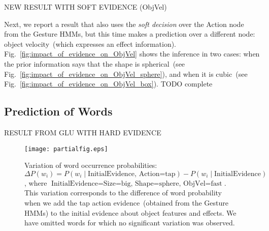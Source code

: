 NEW RESULT WITH SOFT EVIDENCE (ObjVel)

\begin{figure*}
\centering
{} \quad
%
\caption{Predictions about the object velocity of different objects, when given probabilistic soft evidence about the action.}
\label{fig:impact_of_evidence_on_ObjVel}
\end{figure*}

Next, we report a result that also uses the \emph{soft decision} over the Action node from the Gesture \acp{HMM}, but this time makes a prediction over a different node: object velocity~(which expresses an effect information).
Fig.~\ref{fig:impact_of_evidence_on_ObjVel} shows the inference in two cases: when the prior information says that the shape is spherical~(see Fig.~\ref{fig:impact_of_evidence_on_ObjVel_sphere}), and when it is cubic~(see Fig.~\ref{fig:impact_of_evidence_on_ObjVel_box}).
TODO complete

\subsection{Prediction of Words}

RESULT FROM GLU WITH HARD EVIDENCE

\begin{figure}
\centering
\texttt{[image: partialfig.eps]}
\caption{Variation of word occurrence probabilities:
$\Delta P(w_i) = P(w_i \mid \text{InitialEvidence, Action=tap}) - P(w_i \mid \text{InitialEvidence})$, where $\text{InitialEvidence} = \text{Size=big, Shape=sphere, ObjVel=fast}$.
This variation corresponds to the difference of word probability when we add the tap action evidence~(obtained from the Gesture \acp{HMM}) to the initial evidence about object features and effects. We have omitted words for which no significant variation was observed.}
\label{fig:probdiff}
\end{figure}

